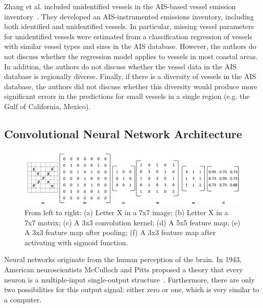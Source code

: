 Zhang et al. included unidentified vessels in the AIS-based vessel emission inventory~\cite{Zhang2019TheSO}. They developed an AIS-instrumented emissions inventory, including both identified and unidentified vessels. In particular, missing vessel parameters for unidentified vessels were estimated from a classification regression of vessels with similar vessel types and sizes in the AIS database. However, the authors do not discuss whether the regression model applies to vessels in most coastal areas. In addition, the authors do not discuss whether the vessel data in the AIS database is regionally diverse. Finally, if there is a diversity of vessels in the AIS database, the authors did not discuss whether this diversity would produce more significant errors in the predictions for small vessels in a single region (e.g. the Gulf of California, Mexico).

\subsection{Convolutional Neural Network Architecture}
\begin{figure}[!t]
    \centering
    \includegraphics[width=7in]{img/X.pdf}
    \caption{From left to right: (a) Letter X in a 7x7 image; (b) Letter X in a 7x7 matrix; (c) A 3x3 convolution kernel; (d) A 5x5 feature map; (e) A 3x3 feature map after pooling; (f) A 3x3 feature map after activating with sigmoid function.}
    \label{X}
\end{figure}


Neural networks originate from the human perception of the brain. In 1943, American neuroscientists McCulloch and Pitts proposed a theory that every neuron is a multiple-input single-output structure~\cite{mcculloch1943logical}. Furthermore, there are only two possibilities for this output signal: either zero or one, which is very similar to a computer.

